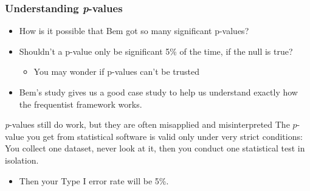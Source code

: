 \documentclass[10pt, block=fill]{beamer}
\begin{document}
\begin{frame}
  \frametitle{Understanding \textit{p}-values}
  
  \begin{itemize}
    \item How is it possible that Bem got so many significant p-values?
    \item Shouldn't a p-value only be significant 5\% of the time, if the null is true?
    \begin{itemize}
        \item You may wonder if p-values can't be trusted
    \end{itemize}
    \item Bem's study gives us a good case study to help us understand exactly how the frequentist framework works.
  \end{itemize}
  
  \begin{block}{\textit{p}-values still do work, but they are often misapplied and misinterpreted}
    The $p$-value you get from statistical software is valid only under very strict conditions: You collect one dataset, never look at it, then you conduct one statistical test in isolation.
    \begin{itemize}
      \item Then your Type I error rate will be 5\%.
    \end{itemize}
  \end{block}


    
\end{frame}
\end{document}
